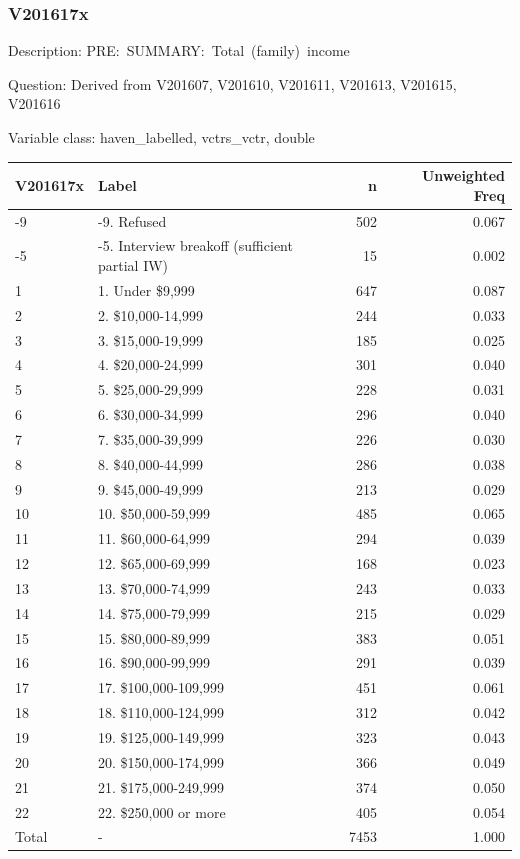 \documentclass[
]{krantz}
\begin{document}
\hypertarget{v201617x}{%
\subsubsection*{V201617x}\label{v201617x}}


Description: PRE:~SUMMARY:~Total~(family)~income

Question: Derived from V201607, V201610, V201611, V201613, V201615, V201616

Variable class: haven\_labelled, vctrs\_vctr, double

\begin{tabular}[t]{l|l|r|r}
\hline
V201617x & Label & n & Unweighted Freq\\
\hline
-9 & -9. Refused & 502 & 0.067\\
\hline
-5 & -5. Interview breakoff (sufficient partial IW) & 15 & 0.002\\
\hline
1 & 1. Under \$9,999 & 647 & 0.087\\
\hline
2 & 2. \$10,000-14,999 & 244 & 0.033\\
\hline
3 & 3. \$15,000-19,999 & 185 & 0.025\\
\hline
4 & 4. \$20,000-24,999 & 301 & 0.040\\
\hline
5 & 5. \$25,000-29,999 & 228 & 0.031\\
\hline
6 & 6. \$30,000-34,999 & 296 & 0.040\\
\hline
7 & 7. \$35,000-39,999 & 226 & 0.030\\
\hline
8 & 8. \$40,000-44,999 & 286 & 0.038\\
\hline
9 & 9. \$45,000-49,999 & 213 & 0.029\\
\hline
10 & 10. \$50,000-59,999 & 485 & 0.065\\
\hline
11 & 11. \$60,000-64,999 & 294 & 0.039\\
\hline
12 & 12. \$65,000-69,999 & 168 & 0.023\\
\hline
13 & 13. \$70,000-74,999 & 243 & 0.033\\
\hline
14 & 14. \$75,000-79,999 & 215 & 0.029\\
\hline
15 & 15. \$80,000-89,999 & 383 & 0.051\\
\hline
16 & 16. \$90,000-99,999 & 291 & 0.039\\
\hline
17 & 17. \$100,000-109,999 & 451 & 0.061\\
\hline
18 & 18. \$110,000-124,999 & 312 & 0.042\\
\hline
19 & 19. \$125,000-149,999 & 323 & 0.043\\
\hline
20 & 20. \$150,000-174,999 & 366 & 0.049\\
\hline
21 & 21. \$175,000-249,999 & 374 & 0.050\\
\hline
22 & 22. \$250,000 or more & 405 & 0.054\\
\hline
Total & - & 7453 & 1.000\\
\hline
\end{tabular}
\end{document}
